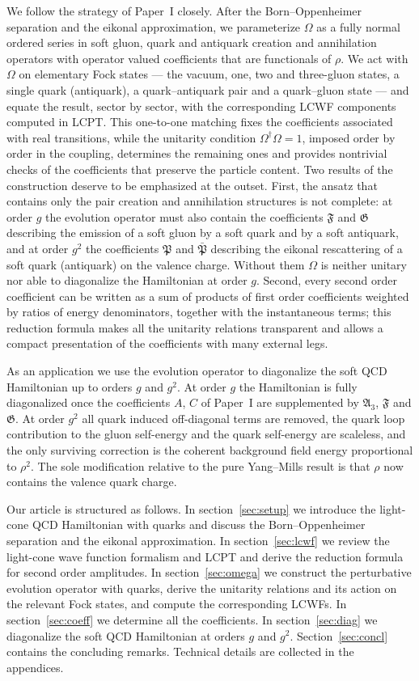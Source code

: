 \documentclass[11pt,a4paper]{article}
\numberwithin{equation}{section}
\newcommand{\mf}[1]{\mathfrak{#1}}
\newcommand{\dg}{\dagger}
\newcommand{\OM}{\Omega}
\begin{document}
We follow the strategy of Paper~I closely. After the Born--Oppenheimer separation and the
eikonal approximation, we parameterize $\OM$ as a fully normal ordered series in soft gluon,
quark and antiquark creation and annihilation operators with operator valued coefficients that
are functionals of $\rho$. We act with $\OM$ on elementary Fock states --- the vacuum, one, two
and three-gluon states, a single quark (antiquark), a quark--antiquark pair and a
quark--gluon state --- and equate the result, sector by sector, with the corresponding LCWF
components computed in LCPT. This one-to-one matching fixes the coefficients associated with
real transitions, while the unitarity condition $\OM^{\dg}\OM=1$, imposed order by order in the
coupling, determines the remaining ones and provides nontrivial checks of the coefficients that
preserve the particle content. Two results of the construction deserve to be emphasized at the
outset. First, the ansatz that contains only the pair creation and annihilation structures is
not complete: at order $g$ the evolution operator must also contain the coefficients
$\mf F$ and $\mf G$ describing the emission of a soft gluon by a soft quark and by a soft
antiquark, and at order $g^{2}$ the coefficients $\mf P$ and $\bar{\mf P}$ describing the
eikonal rescattering of a soft quark (antiquark) on the valence charge. Without them $\OM$ is
neither unitary nor able to diagonalize the Hamiltonian at order $g$. Second, every second order
coefficient can be written as a sum of products of first order coefficients weighted by ratios
of energy denominators, together with the instantaneous terms; this reduction formula makes all
the unitarity relations transparent and allows a compact presentation of the coefficients with
many external legs.

As an application we use the evolution operator to diagonalize the soft QCD Hamiltonian up to
orders $g$ and $g^{2}$. At order $g$ the Hamiltonian is fully diagonalized once the coefficients
$A$, $C$ of Paper~I are supplemented by $\mf A_{3}$, $\mf F$ and $\mf G$. At order $g^{2}$ all
quark induced off-diagonal terms are removed, the quark loop contribution to the gluon
self-energy and the quark self-energy are scaleless, and the only surviving correction is the
coherent background field energy proportional to $\rho^{2}$. The sole modification relative to
the pure Yang--Mills result is that $\rho$ now contains the valence quark charge.

Our article is structured as follows. In section~\ref{sec:setup} we introduce the light-cone QCD
Hamiltonian with quarks and discuss the Born--Oppenheimer separation and the eikonal
approximation. In section~\ref{sec:lcwf} we review the light-cone wave function formalism and
LCPT and derive the reduction formula for second order amplitudes. In
section~\ref{sec:omega} we construct the perturbative evolution operator with quarks, derive the
unitarity relations and its action on the relevant Fock states, and compute the corresponding
LCWFs. In section~\ref{sec:coeff} we determine all the coefficients. In section~\ref{sec:diag} we
diagonalize the soft QCD Hamiltonian at orders $g$ and $g^{2}$. Section~\ref{sec:concl} contains
the concluding remarks. Technical details are collected in the appendices.
\end{document}
